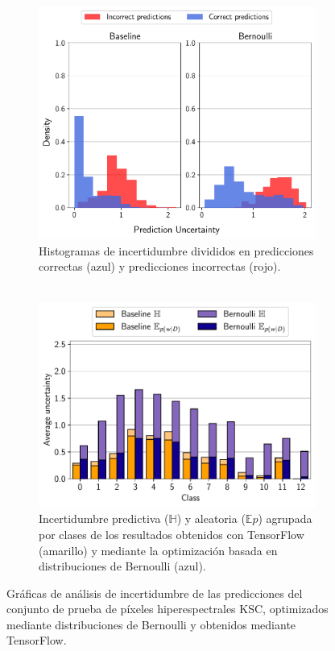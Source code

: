 \begin{figure}[h]
     \centering
     \begin{subfigure}[b]{0.46\textwidth}
         \centering
         \includegraphics[width=\textwidth]{root/Imagenes/opt_software/bernoulli_hist.pdf}
         \caption{Histogramas de incertidumbre divididos en predicciones correctas (azul) y predicciones incorrectas (rojo).\\ \\}
         \label{fig:bernoulli_hist}
     \end{subfigure}
     \hfill
     \begin{subfigure}[b]{0.51\textwidth}
         \centering
         \includegraphics[width=\textwidth]{root/Imagenes/opt_software/bernoulli_class.pdf}
         \caption{Incertidumbre predictiva ($\mathbb{H}$) y aleatoria ($\mathbb{E}p$) agrupada por clases de los resultados obtenidos con TensorFlow (amarillo) y mediante la optimización basada en distribuciones de Bernoulli (azul).}
         \label{fig:bernoulli_class}
     \end{subfigure}
     \caption{Gráficas de análisis de incertidumbre de las predicciones del conjunto de prueba de píxeles hiperespectrales KSC, optimizados mediante distribuciones de Bernoulli y obtenidos mediante TensorFlow.}
     \label{fig:bernoulli}
\end{figure}

